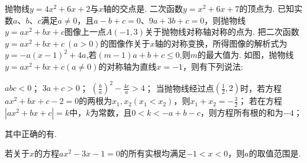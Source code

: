 \documentclass[10pt]{article}
\begin{document}
\begin{questions}{\complitingintroduction}
    \question 抛物线$y = 4x^{2} + 6x + 2$与$x$轴的交点是\complitingline\complitingline.
    \question 二次函数$y = x^{2} + 6x + 7$的顶点为\complitingline.
    \question 已知实数$a$、$b$、$c$满足$a \neq 0$，且$a - b + c = 0$、$9a + 3b + c = 0$，则抛物线$y = ax^{2} + bx + c$图像上一点$A( - 1,3)$关于抛物线对称轴对称的点为\complitingline.
    \question 把二次函数$y = ax^{2} + bx + c\ (a > 0)$的图像作关于$x$轴的对称变换，所得图像的解析式为$y = - a(x - 1)^{2} + 4a$,若$(m - 1)a + b + c \leq 0$,则$m$的最大值为\complitingline.
    \question 如图，抛物线$y = ax^{2} + bx + c (a \neq 0)$的对称轴为直线$x = - 1$，则有下列说法:
    \begin{subsubquestions}
        \subsubquestion $abc < 0$；
        \subsubquestion $3a + c > 0$；
        \subsubquestion $\left( \frac{b}{a} \right)^{2} - \frac{4c}{a} > 4$；
        \subsubquestion 当抛物线经过点$\left( \frac{1}{2},2 \right)$时，若方程$ax^{2} + bx + c - 2 = 0$的两根为$x_{1},x_{2}\left( x_{1} < x_{2} \right)$，则$x_{1} + x_{2} = - \frac{3}{2}$；
        \subsubquestion 若在方程$\left| ax^{2} + bx + c \right| = k$中，$k$为常数，且$0 < k < - a + b - c$，则方程所有根的和为$- 4$；
    \end{subsubquestions}
    其中正确的有\complitingline\complitingline.
    \begin{figure}[!htb]
        \centering
        \raggedleft
    \end{figure}
    \question 若关于$x$的方程$ax^2-3x-1=0$的所有实根均满足$-1<x<0$，则$a$的取值范围是\complitingline.
\end{questions}
\end{document}
